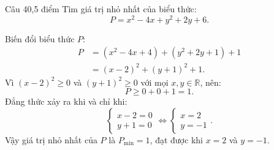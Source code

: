 \begin{de_cau}{Câu 4}{0,5 điểm}
Tìm giá trị nhỏ nhất của biểu thức:
\[P = x^2 - 4x + y^2 + 2y + 6.\]
\end{de_cau}

\begin{loi_giai_cau}
Biến đổi biểu thức $P$:
\begin{align*}
P &= (x^2 - 4x + 4) + (y^2 + 2y + 1) + 1 \\
  &= (x - 2)^2 + (y + 1)^2 + 1.
\end{align*}
Vì $(x - 2)^2 \ge 0$ và $(y + 1)^2 \ge 0$ với mọi $x, y \in \mathbb{R}$, nên:
\[P \ge 0 + 0 + 1 = 1.\]
Đẳng thức xảy ra khi và chỉ khi:
\[\begin{cases} x - 2 = 0 \\ y + 1 = 0 \end{cases} \Leftrightarrow \begin{cases} x = 2 \\ y = -1 \end{cases}.\]
Vậy giá trị nhỏ nhất của $P$ là $\boxed{P_{\min} = 1}$, đạt được khi $x = 2$ và $y = -1$.
\end{loi_giai_cau}
